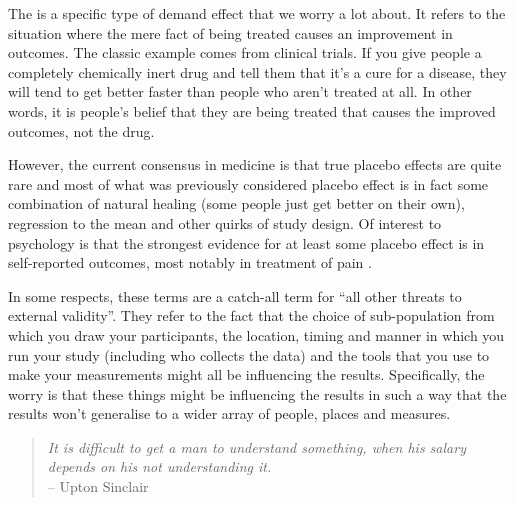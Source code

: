 The  is a specific type of demand effect that we worry a lot about. It refers to the situation where the mere fact of being treated causes an improvement in outcomes. The classic example comes from clinical trials. If you give people a completely chemically inert drug and tell them that it's a cure for a disease, they will tend to get better faster than people who aren't treated at all. In other words, it is people's belief that they are being treated that causes the improved outcomes, not the drug.

However, the current consensus in medicine is that true placebo effects are quite rare and most of what was previously considered placebo effect is in fact some combination of natural healing (some people just get better on their own), regression to the mean and other quirks of study design. Of interest to psychology is that the strongest evidence for at least some placebo effect is in self-reported outcomes, most notably in treatment of pain \parencite{hrobjartsson2010}.

 
In some respects, these terms are a catch-all term for ``all other threats to external validity''. They refer to the fact that the choice of sub-population from which you draw your participants, the location, timing and manner in which you run your study (including who collects the data) and the tools that you use to make your measurements might all be influencing the results. Specifically, the worry is that these things might be influencing the results in such a way that the results won't generalise to a wider array of people, places and measures. 
 

\begin{quote}
{\it It is difficult to get a man to understand something, when his salary depends on his not understanding it.}\\
\hspace*{2cm}-- Upton Sinclair
\end{quote}


